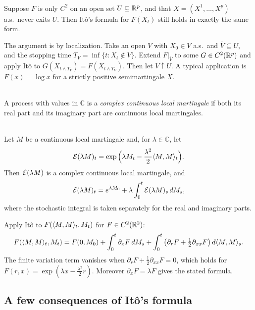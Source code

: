 \begin{remark}\label{chap5.2:remark-open_set}
\\
Suppose $F$ is only $C^2$ on an open set $U\subseteq\mathbb{R}^p$, and that $X=(X^1,\dots,X^p)$ a.s.\ never exits $U$. Then Itô's formula for $F(X_t)$ still holds in exactly the same form.

The argument is by localization. Take an open $V$ with $X_0\in V$ a.s.\ and $\overline V\subseteq U$, and the stopping time $T_V=\inf\{t:X_t\notin V\}$. Extend $F|_{\overline V}$ to some $G\in C^2(\mathbb{R}^p)$ and apply Itô to $G(X_{t\wedge T_V})=F(X_{t\wedge T_V})$. Then let $V\uparrow U$. A typical application is $F(x)=\log x$ for a strictly positive semimartingale $X$.
\end{remark}

\begin{definition}
\\
A process with values in $\mathbb{C}$ is a \textit{complex continuous local martingale} if both its real part and its imaginary part are continuous local martingales.
\end{definition}

\begin{proposition}\label{chap5.2:proposition-exponential_martingale}
\\
Let $M$ be a continuous local martingale and, for $\lambda\in\mathbb{C}$, let
$$\mathcal{E}(\lambda M)_t=\exp\Big(\lambda M_t-\frac{\lambda^2}{2}\langle M,M\rangle_t\Big).$$
Then $\mathcal{E}(\lambda M)$ is a complex continuous local martingale, and
$$\mathcal{E}(\lambda M)_t=e^{\lambda M_0}+\lambda\int_0^t\mathcal{E}(\lambda M)_s\,dM_s,$$
where the stochastic integral is taken separately for the real and imaginary parts.
\end{proposition}

\begin{proofidea}
Apply Itô to $F(\langle M,M\rangle_t,M_t)$ for $F\in C^2(\mathbb{R}^2)$:
$$F(\langle M,M\rangle_t,M_t)=F(0,M_0)+\int_0^t\partial_xF\,dM_s+\int_0^t\big(\partial_rF+\tfrac12\partial_{xx}F\big)\,d\langle M,M\rangle_s.$$
The finite variation term vanishes when $\partial_rF+\frac12\partial_{xx}F=0$, which holds for $F(r,x)=\exp(\lambda x-\frac{\lambda^2}{2}r)$. Moreover $\partial_xF=\lambda F$ gives the stated formula.
\end{proofidea}

\subsection{A few consequences of Itô's formula}

